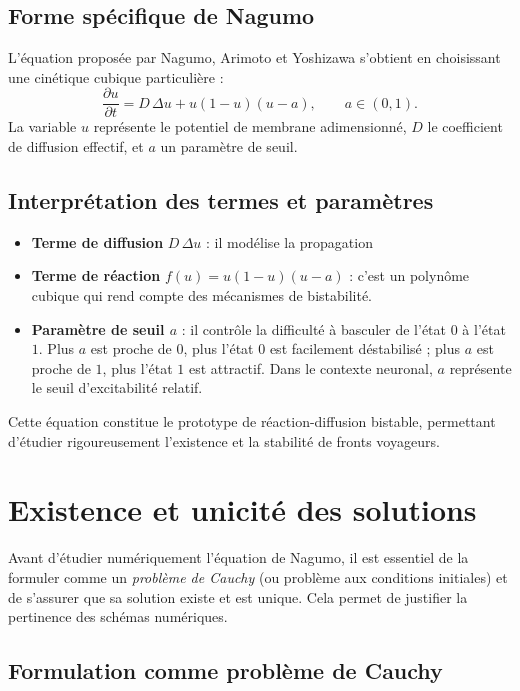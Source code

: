 \documentclass[11pt,a4paper]{report}
\begin{document}
\subsection*{Forme spécifique de Nagumo}

L'équation proposée par Nagumo, Arimoto et Yoshizawa s'obtient en choisissant une cinétique cubique particulière :
\[
\frac{\partial u}{\partial t} = D\,\Delta u + u(1-u)(u-a), \qquad a \in (0,1).
\]
La variable $u$ représente le potentiel de membrane adimensionné, $D$ le coefficient de diffusion effectif, et $a$ un paramètre de seuil.

\subsection*{Interprétation des termes et paramètres}

\begin{itemize}
  \item \textbf{Terme de diffusion} $D\,\Delta u$ : il modélise la propagation 
  
  \item \textbf{Terme de réaction} $f(u)=u(1-u)(u-a)$ : c'est un polynôme cubique qui rend compte des mécanismes de bistabilité. 
  
  \item \textbf{Paramètre de seuil $a$} : il contrôle la difficulté à basculer de l'état $0$ à l'état $1$. Plus $a$ est proche de $0$, plus l'état $0$ est facilement déstabilisé ; plus $a$ est proche de $1$, plus l'état $1$ est attractif. Dans le contexte neuronal, $a$ représente le seuil d'excitabilité relatif.
\end{itemize}

Cette équation constitue le prototype de réaction-diffusion bistable, permettant d'étudier rigoureusement l'existence et la stabilité de fronts voyageurs.

\section{Existence et unicité des solutions}

Avant d’étudier numériquement l’équation de Nagumo, il est essentiel de la formuler comme un \textit{problème de Cauchy} (ou problème aux conditions initiales) et de s’assurer que sa solution existe et est unique. Cela permet de justifier la pertinence des schémas numériques.

\subsection*{Formulation comme problème de Cauchy}
\end{document}

